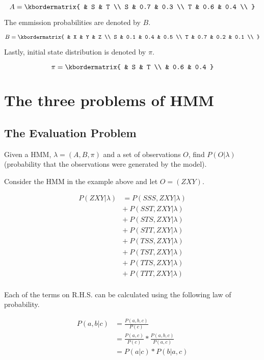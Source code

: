 \documentclass[11pt, a4paper]{article}
\begin{document}
\[
	A = \kbordermatrix{
		& S & T \\
		S & 0.7 & 0.3 \\
		T & 0.6 & 0.4 \\
	}
\]

The emmission probabilities are denoted by $B$.

\[
	B = \kbordermatrix{
		& X & Y & Z \\
		S & 0.1 & 0.4 & 0.5 \\
		T & 0.7 & 0.2 & 0.1 \\
	}
\]

Lastly, initial state distribution is denoted by $\pi$.

\[
	\pi = \kbordermatrix{
		& S & T \\
		& 0.6 & 0.4  
	}
\]

\section{The three problems of HMM}

\subsection{The Evaluation Problem}

Given a HMM, $\lambda=(A, B, \pi)$ and a set of observations $O$, find $P(O|\lambda)$ (probability that the observations were generated by the model).

Consider the HMM in the example above and let $O = (ZXY)$.

\begin{align*}
	P(ZXY|\lambda) & = P(SSS, ZXY|\lambda)  \\
	               & +\ P(SST, ZXY|\lambda) \\
	               & +\ P(STS, ZXY|\lambda) \\
	               & +\ P(STT, ZXY|\lambda) \\
	               & +\ P(TSS, ZXY|\lambda) \\
	               & +\ P(TST, ZXY|\lambda) \\
	               & +\ P(TTS, ZXY|\lambda) \\
	               & +\ P(TTT, ZXY|\lambda) \\  
\end{align*}

Each of the terms on R.H.S. can be calculated using the following law of probability.

\begin{align*}
	P(a, b|c) & = \frac{P(a, b, c) }{P(c)}                            \\ 
	          & = \frac{P(a, c) }{P(c)} * \frac{P(a, b, c) }{P(a, c)} \\
	          & = P(a|c) * P(b|a,c)                                   
\end{align*} 
\end{document}
